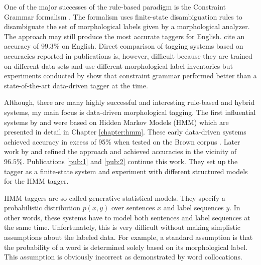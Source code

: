 One of the major successes of the rule-based paradigm is the
Constraint Grammar formalism \citep{Karlsson1995}. The formalism uses
finite-state disambiguation rules to disambiguate the set of
morphological labels given by a morphological analyzer. The approach
may still produce the most accurate taggers for English.
\cite{Voutilainen1995} cite an accuracy of 99.3\% on English. Direct
comparison of tagging systems based on accuracies reported in
publications is, however, difficult because they are trained on
different data sets and use different morphological label inventories
but experiments conducted by \cite{Samuelsson1997} show that
constraint grammar performed better than a state-of-the-art
data-driven tagger at the time.

Although, there are many highly successful and interesting rule-based
and hybrid systems, my main focus is data-driven morphological
tagging. The first influential systems by \cite{Church1988} and
\cite{DeRose1988} were based on Hidden Markov Models (HMM) which are
presented in detail in Chapter \ref{chapter:hmm}. These early
data-driven systems achieved accuracy in excess of 95\% when tested on
the Brown corpus \citep{Francis1964}. Later work by \cite{Brants2000}
and \cite{Halacsy2007} refined the approach and achieved accuracies in
the vicinity of $96.5\%$. Publications \ref{pub:1} and
\ref{pub:2} continue this work. They set up the tagger as a
finite-state system and experiment with different structured models
for the HMM tagger.

HMM taggers are so called generative statistical models. They specify
a probabilistic distribution $p(x,y)$ over sentences $x$ and label
sequences $y$. In other words, these systems have to model both
sentences and label sequences at the same time. Unfortunately, this is
very difficult without making simplistic assumptions about the labeled
data. For example, a standard assumption is that the probability of a
word is determined solely based on its morphological label. This
assumption is obviously incorrect as demonstrated by word
collocations. %

